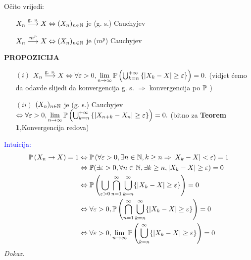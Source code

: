 \documentclass{article}
\begin{document}
Očito vrijedi:
\begin{itemize}
    \item[\ding{113}] \(X_n\overset{\text{g. s.}}{\longrightarrow}X\Leftrightarrow(X_n)_{n\in\Bbb N}\) je (g. s.) Cauchyjev
    \item[\ding{113}] \(X_n\overset{m^p}{\longrightarrow}X\Leftrightarrow(X_n)_{n\in\Bbb N}\) je (\(m^p\)) Cauchyjev
\end{itemize}
\textbf{PROPOZICIJA}
\begin{itemize}
    \item[\((i)\)] \(X_n\overset{\text{g. s.}}{\longrightarrow}X\Leftrightarrow\forall\varepsilon>0,\lim\limits_{n\to\infty}\Bbb P\left(\bigcup_{k=n}^{+\infty}\left\{|X_k-X|\ge\varepsilon\right\}\right)=0.\) (vidjet ćemo da odavde slijedi da konvergencija g. s. \(\Rightarrow\) konvergencija po \(\Bbb P\) )
    \item[\((ii)\)] \((X_n)_{n\in\Bbb N}\) je (g. s.) Cauchyjev \(\Leftrightarrow\forall\varepsilon>0,\lim\limits_{n\to\infty}\Bbb P\left(\bigcup_{k=n}^{+\infty}\left\{|X_{n+k}-X_n|\ge\varepsilon\right\}\right)=0.\) (bitno za \textbf{Teorem 1},\textsection Konvergencija redova)
\end{itemize}
\textcolor{Blue}{Intuicija:\newline
\[\begin{aligned}\Bbb P\left(X_n\to X\right)=1&\Leftrightarrow\Bbb P\left(\forall\varepsilon>0,\exists n\in\Bbb N,k\ge n\Rightarrow|X_k-X|<\varepsilon\right)=1\\&\Leftrightarrow\Bbb P(\exists\varepsilon>0,\forall n\in\Bbb N,\exists k\ge n,|X_k-X|\ge\varepsilon)=0\\&\Leftrightarrow\Bbb P\left(\bigcup_{\varepsilon>0}\bigcap_{n=1}^\infty\bigcup_{k=n}^\infty\{|X_k-X|\ge\varepsilon\}\right)=0\\&\Leftrightarrow\forall\varepsilon>0,\Bbb P\left(\bigcap_{n=1}^\infty\bigcup_{k=n}^\infty\{|X_k-X|\ge\varepsilon\}\right)=0\\&\Leftrightarrow\forall\varepsilon>0,\lim_{n\to\infty}\Bbb P\left(\bigcup_{k=n}^\infty\{|X_k-X|\ge\varepsilon\}\right)=0\end{aligned}\]}
\textit{Dokaz.}
\end{document}
